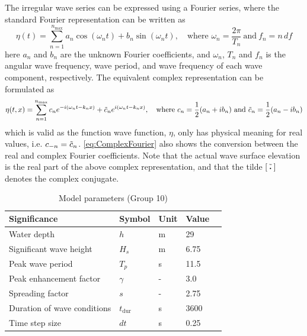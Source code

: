The irregular wave series can be expressed using a Fourier series, where the standard Fourier representation can be written as
\begin{equation}
    \eta(t) = \sum_{n=1}^{n_{\text{max}}} a_n \cos{(\omega_n t)} +b_n \sin{(\omega_n t)}, \quad \text{where }\omega_n=\frac{2\pi}{T_n} \  \text{and} \ f_n=n\,df
\end{equation}
here $a_n$ and $b_n$ are the unknown Fourier coefficients, and $\omega_n$, $T_n$ and $f_n$ is the angular wave frequency, wave period, and wave frequency of each wave component, respectively. The equivalent complex representation can be formulated as
\begin{equation}
    \eta(t,x) = \sum_{n=1}^{n_{\text{max}}} c_n e^{-i(\omega_n t-k_n x)} + \Tilde{c}_n e^{i(\omega_n t - k_n x)}, \quad \text{where }c_n=\frac{1}{2}(a_n+i b_n) \ \text{and} \ \Tilde{c}_n=\frac{1}{2}(a_n-i b_n)
    \label{eq:ComplexFourier}
\end{equation}
which is valid as the function wave function, $\eta$, only has physical meaning for real values, i.e. $c_{-n}=\Tilde{c}_n$. \cref{eq:ComplexFourier} also shows the conversion between the real and complex Fourier coefficients. Note that the actual wave surface elevation is the real part of the above complex representation, and that the tilde $[\, \Tilde{\text{\scalebox{0.5}{\textbullet}}}\,]$ denotes the complex conjugate.

\begin{table}[h]
    \centering
    \caption{Model parameters (Group 10)}
    \begin{tabular}{@{}lllll@{}}
    \toprule
    Significance                            &   Symbol          & Unit       & Value \\ \hline
    Water depth                             &   $h$             & \si{m}     & 29   \\
    Significant wave height                 &   $H_{s}$         & \si{m}     & 6.75   \\
    Peak wave period                        &   $T_p$           & \si{s}     & 11.5  \\ \addlinespace[1mm]
    Peak enhancement factor                 &   $\gamma$        & \si{-}     & 3.0 \\ \addlinespace[1mm]
    Spreading factor                        &   $s$             & \si{-}     & 2.75   \\ \addlinespace[1mm]
    Duration of wave conditions             &   $t_{\text{dur}}$& \si{s}     & 3600   \\
    Time step size                          &   $dt$            & \si{s}     & 0.25   \\
    \bottomrule
    \end{tabular}
    \label{tab:Modelparameters}
\end{table}

